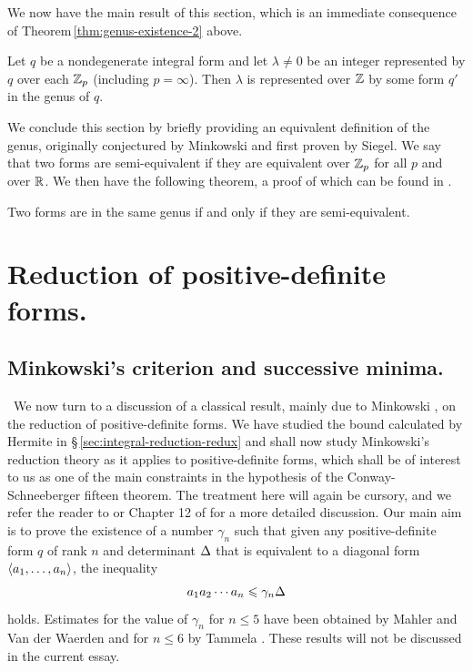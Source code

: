 We now have the main result of this section, which is an immediate consequence of Theorem\,\ref{thm:genus-existence-2} above.

\begin{corollary}
    Let \(q\) be a nondegenerate integral form and let \(\lambda \neq 0\) be an integer represented by \(q\) over each \(\mathbb{Z}_p\) (including \(p = \infty\)). Then \(\lambda\) is represented over \(\mathbb{Z}\) by some form \(q'\) in the genus of \(q\).
\end{corollary}

We conclude this section by briefly providing an equivalent definition of the genus, originally conjectured by Minkowski and first proven by Siegel. We say that two forms are semi-equivalent if they are equivalent over \(\mathbb{Z}_p\) for all \(p\) and over \(\mathbb{R}\). We then have the following theorem, a proof of which can be found in \cite[\S\,5]{siegel1941equivalence}.

\begin{theoremx}
    Two forms are in the same genus if and only if they are semi-equivalent.
\end{theoremx}

\section{Reduction of positive-definite forms.}

\subsection{Minkowski's criterion and successive minima.}~We now turn to a discussion of a classical result, mainly due to Minkowski \cite{schwermer2007reduction,minkowski1885untersuchungen}, on the reduction of positive-definite forms. We have studied the bound calculated by Hermite in \S\,\ref{sec:integral-reduction-redux} and shall now study Minkowski's reduction theory as it applies to positive-definite forms, which shall be of interest to us as one of the main constraints in the hypothesis of the Conway-Schneeberger fifteen theorem. The treatment here will again be cursory, and we refer the reader to \cite{donaldson1979minkowski} or Chapter 12 of \cite{cassels2008rational} for a more detailed discussion. Our main aim is to prove the existence of a number \(\gamma_n\) such that given any positive-definite form \(q\) of rank \(n\) and determinant \({\Delta}\) that is equivalent to a diagonal form \(\langle a_1, \dots, a_n \rangle\), the inequality
\[
    a_1 a_2 \cdots a_n \leqslant \gamma_n {\Delta}
\]
holds. Estimates for the value of \(\gamma_n\) for \(n \leq 5\) have been obtained by Mahler \cite{mahler1938minkowski} and Van der Waerden \cite{van1956reduktionstheorie,van1969dasminimum} and for \(n \leq 6\) by Tammela \cite{tammela1979reduction}. These results will not be discussed in the current essay.

